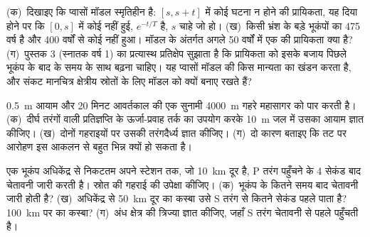 \begin{exercise}[$\star\star\star$]\label{exo:b2:geological-hazards:10}
(क)~दिखाइए कि प्वासों मॉडल स्मृतिहीन है: $[s, s + t]$ में कोई घटना न होने की प्रायिकता,
यह दिया होने पर कि $[0, s]$ में कोई नहीं हुई, $e^{-t/T}$ है, $s$ चाहे जो हो। (ख)~किसी भ्रंश के बड़े भूकंपों का
 475 वर्ष है और 400 वर्षों से कोई नहीं हुआ। मॉडल के अंतर्गत अगले 50 वर्षों में
एक की प्रायिकता क्या है? (ग)~पुस्तक 3 (स्नातक वर्ष 1) का प्रत्यास्थ प्रतिक्षेप सुझाता है कि प्रायिकता को
इसके बजाय पिछले भूकंप के बाद के समय के साथ बढ़ना चाहिए। यह प्वासों मॉडल की किस मान्यता का खंडन करता है,
और संकट मानचित्र क्षेत्रीय स्रोतों के लिए मॉडल को क्यों बनाए रखते हैं?
\end{exercise}

\begin{exercise}[$\star\star\star$]\label{exo:b2:geological-hazards:11}
\qty{0.5}{m} आयाम और 20 मिनट आवर्तकाल की एक सुनामी \qty{4000}{m} गहरे महासागर को पार करती है। (क)~दीर्घ
तरंगों वाली प्रतिज्ञप्ति के ऊर्जा-प्रवाह तर्क का उपयोग करके \qty{10}{m} जल में उसका आयाम
ज्ञात कीजिए। (ख)~दोनों गहराइयों पर उसकी तरंगदैर्ध्य ज्ञात कीजिए। (ग)~दो कारण बताइए कि तट पर आरोहण
इस आकलन से बहुत भिन्न क्यों हो सकता है।
\end{exercise}

\begin{exercise}[$\star\star\star$]\label{exo:b2:geological-hazards:12}
एक भूकंप  अधिकेंद्र से निकटतम अपने स्टेशन तक, जो \qty{10}{km} दूर है, P तरंग पहुँचने के
4 सेकंड बाद चेतावनी जारी करती है। स्रोत की गहराई की उपेक्षा कीजिए। (क)~भूकंप के कितने समय बाद
चेतावनी जारी होती है? (ख)~अधिकेंद्र से \qty{50}{km} दूर का कस्बा उसे S तरंग से कितने सेकंड पहले
पाता है? \qty{100}{km} पर का कस्बा? (ग)~अंध क्षेत्र की त्रिज्या ज्ञात कीजिए, जहाँ
S तरंग चेतावनी से पहले पहुँचती है।
\end{exercise}

